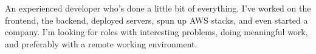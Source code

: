 \documentclass[9pt]{developercv} %
\begin{document}
\vspace{0.5cm}



\begin{minipage}[t]{0.4\textwidth} %
	\vspace{-\baselineskip} %
        An experienced developer who's done a little bit of everything. I've worked on the frontend, the backend, deployed servers, spun up AWS stacks, and even started a company. I'm looking for roles with interesting problems, doing meaningful work, and preferably with a remote working environment.

\end{minipage}
\hfill %
\begin{minipage}[t]{0.5\textwidth} %
	\vspace{-\baselineskip} %
	\begin{barchart}{5.5}
	\end{barchart}
\end{minipage}



\end{document}

